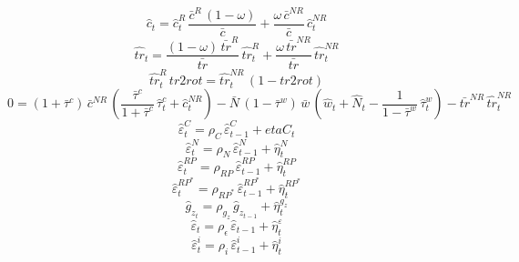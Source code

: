 \begin{dmath}
{\hat{c}_{t}}={\hat{c}^R_{t}}\, \frac{{\bar{c}^R}\, \left(1-{\omega}\right)}{{\bar{c}}}+\frac{{\omega}\, {\bar{c}^{NR}}}{{\bar{c}}}\, {\hat{c}^{NR}_{t}}
\end{dmath}
\begin{dmath}
{\hat{tr}_{t}}=\frac{\left(1-{\omega}\right)\, {\bar{tr}^{R}}}{{\bar{tr}}}\, {\hat{tr}^R_{t}}+\frac{{\omega}\, {\bar{tr}^{NR}}}{{\bar{tr}}}\, {\hat{tr}^{NR}_{t}}
\end{dmath}
\begin{dmath}
{\hat{tr}^R_{t}}\, {tr2rot}={\hat{tr}^{NR}_{t}}\, \left(1-{tr2rot}\right)
\end{dmath}
\begin{dmath}
0=\left(1+{\bar{\tau}^c}\right)\, {\bar{c}^{NR}}\, \left(\frac{{\bar{\tau}^c}}{1+{\bar{\tau}^c}}\, {\hat{\tau}^c_{t}}+{\hat{c}^{NR}_{t}}\right)-{\bar{N}}\, \left(1-{\bar{\tau}^w}\right)\, {\bar{w}}\, \left({\hat{w}_{t}}+{\hat{N}_{t}}-\frac{1}{1-{\bar{\tau}^w}}\, {\hat{\tau}^w_{t}}\right)-{\bar{tr}^{NR}}\, {\hat{tr}^{NR}_{t}}
\end{dmath}
\begin{dmath}
{\hat{\varepsilon}^C_{t}}={\rho_{C}}\, {\hat{\varepsilon}^C_{t-1}}+{etaC_{t}}
\end{dmath}
\begin{dmath}
{\hat{\varepsilon}^N_{t}}={\rho_{N}}\, {\hat{\varepsilon}^N_{t-1}}+{\hat{\eta}^{N}_{t}}
\end{dmath}
\begin{dmath}
{\hat{\varepsilon}^{RP}_{t}}={\rho_{RP}}\, {\hat{\varepsilon}^{RP}_{t-1}}+{\hat{\eta}^{RP}_{t}}
\end{dmath}
\begin{dmath}
{\hat{\varepsilon}^{RP^*}_{t}}={\rho_{RP^*}}\, {\hat{\varepsilon}^{RP^*}_{t-1}}+{\hat{\eta}^{RP^*}_{t}}
\end{dmath}
\begin{dmath}
{\hat{g}_z_{t}}={\rho_{g_z}}\, {\hat{g}_z_{t-1}}+{\hat{\eta}^{g_z}_{t}}
\end{dmath}
\begin{dmath}
{\hat{\varepsilon}_{t}}={\rho_{\epsilon}}\, {\hat{\varepsilon}_{t-1}}+{\hat{\eta}^{\varepsilon}_{t}}
\end{dmath}
\begin{dmath}
{\hat{\varepsilon}^i_{t}}={\rho_{i}}\, {\hat{\varepsilon}^i_{t-1}}+{\hat{\eta}^{i}_{t}}
\end{dmath}
